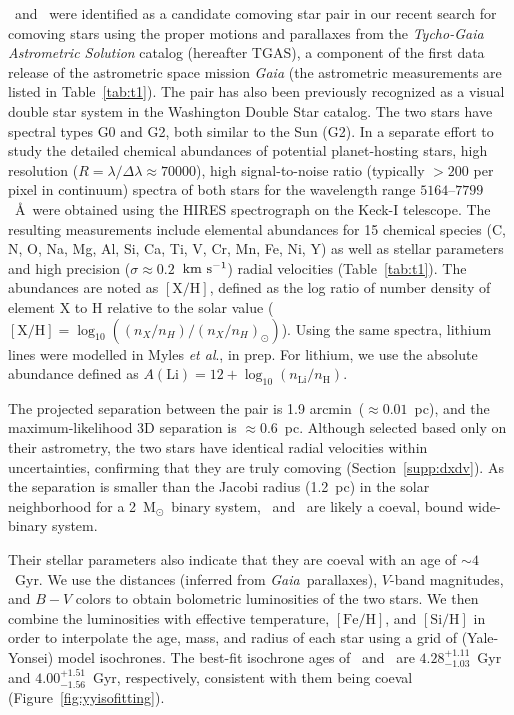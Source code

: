 \documentclass[12pt,letterpaper,margin=1in]{article}
\newcommand{\project}[1]{\textsl{#1}}
\newcommand{\acronym}[1]{{\small{#1}}}
\newcommand{\gaia}{\project{Gaia}}
\newcommand{\sectionname}{Section}
\newcommand{\figname}{Figure}
\newcommand{\tgas}{\acronym{TGAS}}
\newcommand{\etal}{\textit{et al}.}
\newcommand*\elem[1]{\ensuremath{\mathrm{#1}}}
\newcommand*\elemH[1]{\ensuremath{[\mathrm{#1}/\elem{H}]}}
\newcommand{\sunanalog}{\text{Krios}}
\newcommand{\bizarreone}{\text{Kronos}}
\newcommand{\kms}{\ensuremath{\rm km~s^{-1}}}
\newcommand{\msun}{\ensuremath{{\mathrm M}_\odot}}
\renewcommand\tablename{Table}
\begin{document}
\sunanalog\ and \bizarreone\ were identified as a candidate comoving star pair
in our recent search\cite{2017AJ....153..257O} for comoving stars using the
proper motions and parallaxes from the {\it Tycho-Gaia Astrometric Solution}
catalog (hereafter \tgas), a component of the first data release of the
astrometric space mission \gaia\cite{2016A&A...595A...2G} (the astrometric
measurements are listed in \tablename~\ref{tab:t1}).
The pair has also been previously recognized as a visual double star system
in the Washington Double Star catalog\cite{2001AJ....122.3466M}.
The two stars have spectral types G0 and G2, both similar to the Sun (G2).
In a separate effort to study the detailed chemical abundances of potential
planet-hosting stars, high resolution ($R=\lambda/\Delta\lambda\approx 70000$),
high signal-to-noise ratio (typically $>200$ per pixel in continuum) spectra of
both stars for the wavelength range $5164$--$7799$~\AA\ were obtained using the
HIRES spectrograph on the Keck-I telescope\cite{2016ApJS..225...32B}.
The resulting measurements include elemental abundances for 15 chemical species
(C, N, O, Na, Mg, Al, Si, Ca, Ti, V, Cr, Mn, Fe, Ni, Y) as well as stellar
parameters and high precision ($\sigma\approx0.2$~\kms) radial velocities
(Table~\ref{tab:t1}).
The abundances are noted as \elemH{X}, defined as the log ratio of number
density of element \elem{X} to \elem{H} relative to the solar value
($\elemH{X} = \log_{10} ((n_X / n_H) / (n_X / n_H)_\odot)$).
Using the same spectra, lithium lines were modelled in Myles \etal, in prep.
For lithium, we use the absolute abundance defined as $A(\elem{Li}) = 12 +
\log_{10} (n_\elem{Li}/n_\elem{H})$.

The projected separation between the pair is 1.9 arcmin\ ($\approx 0.01$~pc),
and the maximum-likelihood 3D separation is $\approx 0.6$~pc.
Although selected based only on their astrometry, the two stars
have identical radial velocities within uncertainties,
confirming that they are truly comoving (\sectionname~\ref{supp:dxdv}).
As the separation is smaller than the Jacobi radius (1.2~pc) in the solar
neighborhood for a 2~\msun\ binary system\cite{Jiang:2010aa}, \bizarreone\ and
\sunanalog\ are likely a coeval, bound wide-binary system.

Their stellar parameters also indicate that they are coeval with an age of $\sim 4$~Gyr.
We use the distances (inferred from \gaia\ parallaxes), $V$-band magnitudes,
and $B-V$ colors to obtain bolometric luminosities of the two stars\cite{2003AJ....126..778V}.
We then combine the luminosities with effective temperature, \elemH{Fe}, and
\elemH{Si} in order to interpolate the age, mass, and radius of each star
using a grid of (Yale-Yonsei) model isochrones\cite{2013ApJ...776...87S}.
The best-fit isochrone ages of \bizarreone\ and \sunanalog\ are
$4.28_{-1.03}^{+1.11}$~Gyr and $4.00_{-1.56}^{+1.51}$~Gyr, respectively,
consistent with them being coeval (\figname~\ref{fig:yyisofitting}).
\end{document}
